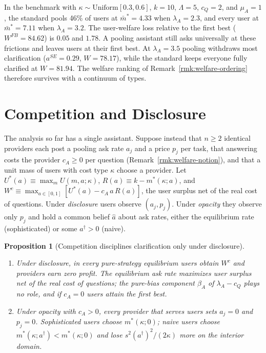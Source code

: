 \documentclass[11pt]{article}
\newtheorem{proposition}{Proposition}
\begin{document}
In the benchmark with $\kappa \sim \text{Uniform}[0.3, 0.6]$, $k = 10$, $\Lambda = 5$, $c_Q = 2$, and $\mu_A = 1$, the standard pools 46\% of users at $\bar m^* = 4.33$ when $\lambda_A = 2.3$, and every user at $\bar m^* = 7.11$ when $\lambda_A = 3.2$. The user-welfare loss relative to the first best ($W^{FB} = 84.62$) is $0.05$ and $1.78$. A pooling assistant still asks universally at these frictions and leaves users at their first best. At $\lambda_A = 3.5$ pooling withdraws most clarification ($a^{SE} = 0.29$, $W = 78.17$), while the standard keeps everyone fully clarified at $W = 81.94$. The welfare ranking of Remark~\ref{rmk:welfare-ordering} therefore survives with a continuum of types.

\section{Competition and Disclosure}
\label{sec:competition}

The analysis so far has a single assistant. Suppose instead that $n \ge 2$ identical providers each post a pooling ask rate $a_j$ and a price $p_j$ per task, that answering costs the provider $c_A \ge 0$ per question (Remark~\ref{rmk:welfare-notion}), and that a unit mass of users with cost type $\kappa$ choose a provider. Let $U^*(a) \equiv \max_m U(m,a;\kappa)$, $R(a) \equiv k - m^*(\kappa;a)$, and $W^c \equiv \max_{a\in[0,1]} [U^*(a) - c_A\,a\,R(a)]$, the user surplus net of the real cost of questions. Under \emph{disclosure} users observe $(a_j, p_j)$. Under \emph{opacity} they observe only $p_j$ and hold a common belief $\hat a$ about ask rates, either the equilibrium rate (sophisticated) or some $a^\dagger > 0$ (naive).

\begin{proposition}[Competition disciplines clarification only under disclosure]
\label{prop:competition}
\begin{enumerate}[label=(\roman*)]
\item Under disclosure, in every pure-strategy equilibrium users obtain $W^c$ and providers earn zero profit. The equilibrium ask rate maximizes user surplus net of the real cost of questions; the pure-bias component $\beta_A$ of $\lambda_A - c_Q$ plays no role, and if $c_A = 0$ users attain the first best.
\item Under opacity with $c_A > 0$, every provider that serves users sets $a_j = 0$ and $p_j = 0$. Sophisticated users choose $m^*(\kappa;0)$; naive users choose $m^*(\kappa;a^\dagger) < m^*(\kappa;0)$ and lose $s^2 (a^\dagger)^2/(2\kappa)$ more on the interior domain.
\end{enumerate}
\end{proposition}
\end{document}
